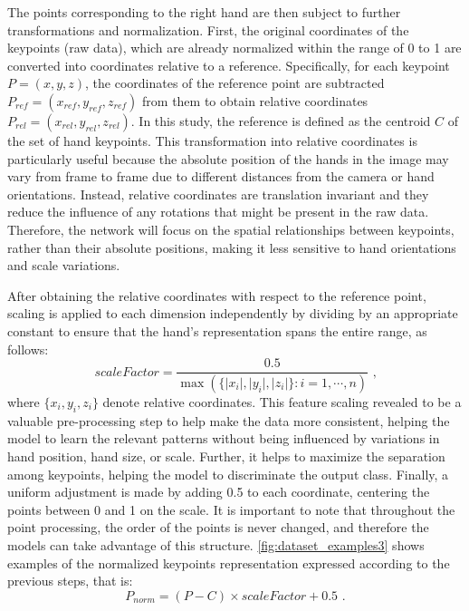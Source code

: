 The points corresponding to the right hand are then subject to further transformations and normalization. First, the original coordinates of the keypoints (raw data), which are already normalized within the range of 0 to 1 are converted into coordinates relative to a reference. Specifically, for each keypoint $P = (x,y,z)$, the coordinates of the reference point are subtracted $P_{ref} = (x_{ref}, y_{ref}, z_{ref})$ from them to obtain relative coordinates $P_{rel} = (x_{rel}, y_{rel}, z_{rel})$. In this study, the reference is defined as the centroid $C$ of the set of hand keypoints.
This transformation into relative coordinates is particularly useful because the absolute position of the hands in the image may vary from frame to frame due to different distances from the camera or hand orientations. Instead, relative coordinates are translation invariant and they reduce the influence of any rotations that might be present in the raw data. Therefore, the network will focus on the spatial relationships between keypoints, rather than their absolute positions, making it less sensitive to hand orientations and scale variations.

After obtaining the relative coordinates with respect to the reference point, scaling is applied to each dimension independently by dividing by an appropriate constant to ensure that the hand’s representation spans the entire range, as follows:
\begin{equation}
scaleFactor = \frac {0.5}{\max(\{\lvert x_i \rvert,\lvert y_i \rvert,\lvert z_i\rvert\}: i=1,\cdots,n)} \text{  ,}
\end{equation}
%
where $\{x_i,y_i,z_i\}$ denote relative coordinates. This feature scaling revealed to be a valuable pre-processing step to help make the data more consistent, helping the model to learn the relevant patterns without being influenced by variations in hand position, hand size, or scale. Further, it helps to maximize the separation among keypoints, helping the model to discriminate the output class. Finally, a uniform adjustment is made by adding 0.5 to each coordinate, centering the points between 0 and 1 on the scale. It is important to note that throughout the point processing, the order of the points is never changed, and therefore the models can take advantage of this structure. \autoref{fig:dataset_examples3} shows examples of the normalized keypoints representation expressed according to the previous steps, that is: 
\begin{equation}
P_{norm} = (P - C) \times scaleFactor + 0.5\text{ .}
\end{equation}


